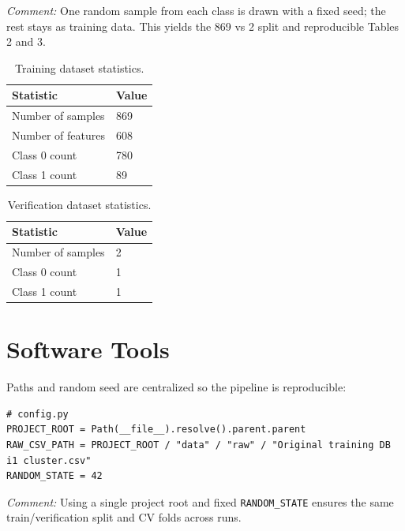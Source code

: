 \documentclass[11pt]{article}
\begin{document}
\textit{Comment:} One random sample from each class is drawn with a fixed seed; the rest stays as training data. This yields the 869 vs 2 split and reproducible Tables 2 and 3.

\begin{table}[H]
\centering
\caption{Training dataset statistics.}
\begin{tabular}{ll}
\toprule
\textbf{Statistic} & \textbf{Value} \\
\midrule
Number of samples & 869 \\
Number of features & 608 \\
Class 0 count & 780 \\
Class 1 count & 89 \\
\bottomrule
\end{tabular}
\end{table}

\begin{table}[H]
\centering
\caption{Verification dataset statistics.}
\begin{tabular}{ll}
\toprule
\textbf{Statistic} & \textbf{Value} \\
\midrule
Number of samples & 2 \\
Class 0 count & 1 \\
Class 1 count & 1 \\
\bottomrule
\end{tabular}
\end{table}

\section{Software Tools}

Paths and random seed are centralized so the pipeline is reproducible:

\begin{lstlisting}[style=pythonstyle]
# config.py
PROJECT_ROOT = Path(__file__).resolve().parent.parent
RAW_CSV_PATH = PROJECT_ROOT / "data" / "raw" / "Original training DB i1 cluster.csv"
RANDOM_STATE = 42
\end{lstlisting}

\textit{Comment:} Using a single project root and fixed \texttt{RANDOM\_STATE} ensures the same train/verification split and CV folds across runs.
\end{document}
